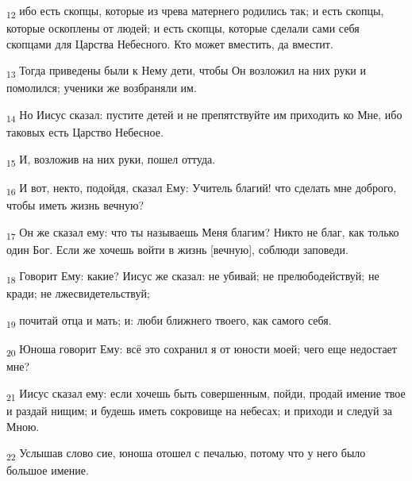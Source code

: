 \begin{tcolorbox}
\textsubscript{12} ибо есть скопцы, которые из чрева матернего родились так; и есть скопцы, которые оскоплены от людей; и есть скопцы, которые сделали сами себя скопцами для Царства Небесного. Кто может вместить, да вместит.
\end{tcolorbox}
\begin{tcolorbox}
\textsubscript{13} Тогда приведены были к Нему дети, чтобы Он возложил на них руки и помолился; ученики же возбраняли им.
\end{tcolorbox}
\begin{tcolorbox}
\textsubscript{14} Но Иисус сказал: пустите детей и не препятствуйте им приходить ко Мне, ибо таковых есть Царство Небесное.
\end{tcolorbox}
\begin{tcolorbox}
\textsubscript{15} И, возложив на них руки, пошел оттуда.
\end{tcolorbox}
\begin{tcolorbox}
\textsubscript{16} И вот, некто, подойдя, сказал Ему: Учитель благий! что сделать мне доброго, чтобы иметь жизнь вечную?
\end{tcolorbox}
\begin{tcolorbox}
\textsubscript{17} Он же сказал ему: что ты называешь Меня благим? Никто не благ, как только один Бог. Если же хочешь войти в жизнь [вечную], соблюди заповеди.
\end{tcolorbox}
\begin{tcolorbox}
\textsubscript{18} Говорит Ему: какие? Иисус же сказал: не убивай; не прелюбодействуй; не кради; не лжесвидетельствуй;
\end{tcolorbox}
\begin{tcolorbox}
\textsubscript{19} почитай отца и мать; и: люби ближнего твоего, как самого себя.
\end{tcolorbox}
\begin{tcolorbox}
\textsubscript{20} Юноша говорит Ему: всё это сохранил я от юности моей; чего еще недостает мне?
\end{tcolorbox}
\begin{tcolorbox}
\textsubscript{21} Иисус сказал ему: если хочешь быть совершенным, пойди, продай имение твое и раздай нищим; и будешь иметь сокровище на небесах; и приходи и следуй за Мною.
\end{tcolorbox}
\begin{tcolorbox}
\textsubscript{22} Услышав слово сие, юноша отошел с печалью, потому что у него было большое имение.
\end{tcolorbox}

